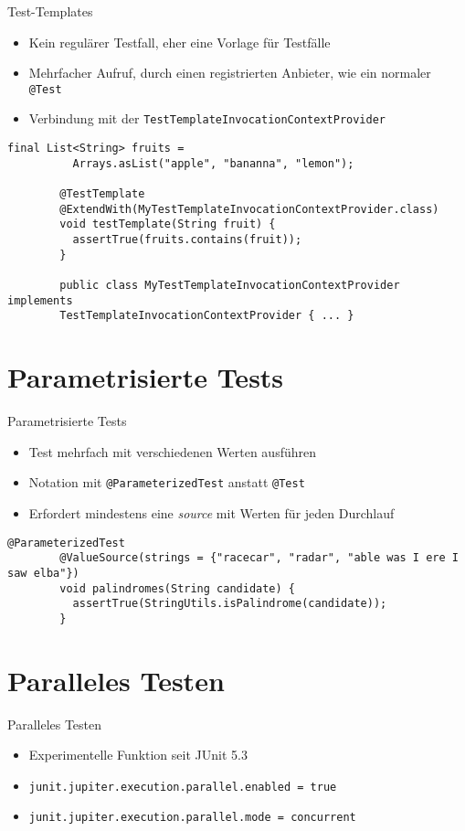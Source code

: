 \documentclass[utf8,t,aspectratio=169]{beamer}
\begin{document}
    \begin{frame}[fragile]{Test-Templates}
      \begin{itemize}
        \item Kein regulärer Testfall, eher eine Vorlage für Testfälle
        \item Mehrfacher Aufruf, durch einen registrierten Anbieter, wie ein
          normaler \lstinline|@Test|
        \item Verbindung mit der
          \lstinline|TestTemplateInvocationContextProvider|
      \end{itemize}
      \begin{lstlisting}[gobble=8]
        final List<String> fruits =
          Arrays.asList("apple", "bananna", "lemon");

        @TestTemplate
        @ExtendWith(MyTestTemplateInvocationContextProvider.class)
        void testTemplate(String fruit) {
          assertTrue(fruits.contains(fruit));
        }

        public class MyTestTemplateInvocationContextProvider implements
        TestTemplateInvocationContextProvider { ... }
      \end{lstlisting}
    \end{frame}

  \section{Parametrisierte Tests}
    \begin{frame}[fragile]{Parametrisierte Tests}
      \begin{itemize}
        \item Test mehrfach mit verschiedenen Werten ausführen
        \item Notation mit \lstinline|@ParameterizedTest| anstatt
          \lstinline|@Test|
        \item Erfordert mindestens eine \textit{source} mit Werten für jeden
          Durchlauf
      \end{itemize}
      \begin{lstlisting}[gobble=8]
        @ParameterizedTest
        @ValueSource(strings = {"racecar", "radar", "able was I ere I saw elba"})
        void palindromes(String candidate) {
          assertTrue(StringUtils.isPalindrome(candidate));
        }
      \end{lstlisting}
    \end{frame}

  \section{Paralleles Testen}
    \begin{frame}{Paralleles Testen}
      \begin{itemize}
        \item Experimentelle Funktion seit JUnit 5.3
        \item \lstinline|junit.jupiter.execution.parallel.enabled = true|
        \item \lstinline|junit.jupiter.execution.parallel.mode = concurrent|
      \end{itemize}
    \end{frame}
\end{document}
